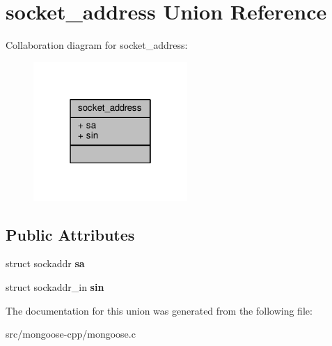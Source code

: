 \hypertarget{unionsocket__address}{}\section{socket\+\_\+address Union Reference}
\label{unionsocket__address}


Collaboration diagram for socket\+\_\+address\+:
\nopagebreak
\begin{figure}[H]
\begin{center}
\leavevmode
\includegraphics[width=166pt]{d5/d68/unionsocket__address__coll__graph}
\end{center}
\end{figure}
\subsection*{Public Attributes}
\begin{DoxyCompactItemize}
\item 
struct sockaddr {\bfseries sa}\hypertarget{unionsocket__address_ab6a9b0bc545e839df7e06e5b6bff0891}{}\label{unionsocket__address_ab6a9b0bc545e839df7e06e5b6bff0891}

\item 
struct sockaddr\+\_\+in {\bfseries sin}\hypertarget{unionsocket__address_af540a7224ea459c48bc6ec1ca592e55d}{}\label{unionsocket__address_af540a7224ea459c48bc6ec1ca592e55d}

\end{DoxyCompactItemize}


The documentation for this union was generated from the following file\+:\begin{DoxyCompactItemize}
\item 
src/mongoose-\/cpp/mongoose.\+c\end{DoxyCompactItemize}
